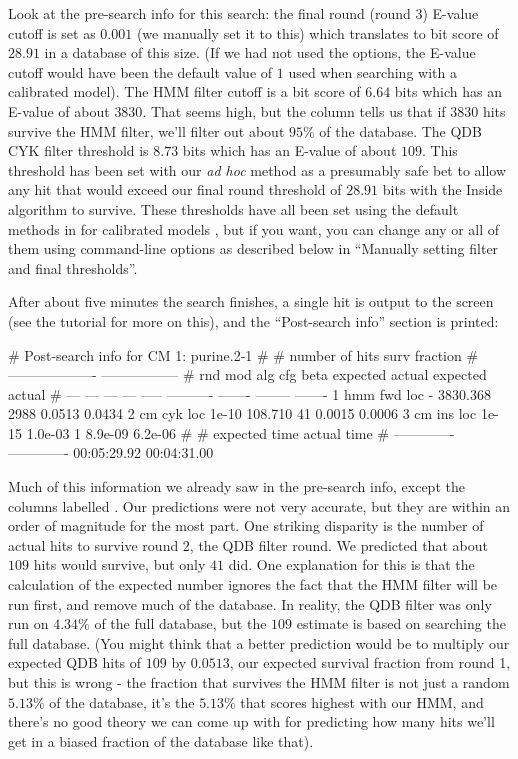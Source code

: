 Look at the pre-search info for this search: the final round (round 3)
E-value cutoff is set as $0.001$ (we manually set it to this) which
translates to bit score of $28.91$ in a database of this size. (If we
had not used the  options, the E-value cutoff would have been
the default value of $1$ used when searching with a calibrated
model). The HMM filter cutoff is a bit score of $6.64$ bits which has
an E-value of about $3830$.  That seems high, but the 
column tells us that if $3830$ hits survive the HMM filter, we'll
filter out about $95\%$ of the database. The QDB CYK filter threshold
is $8.73$ bits which has an E-value of about $109$. This threshold has
been set with our \emph{ad hoc} method as a presumably safe bet to
allow any hit that would exceed our final round threshold of $28.91$
bits with the Inside algorithm to survive. These thresholds have all
been set using the default methods in  for calibrated
models \cite{Nawrocki09b}, but if you want, you can change any or all
of them using command-line options as described below in ``Manually
setting filter and final thresholds''.

After about five minutes the search finishes, a single hit is output
to the screen (see the tutorial for more on this), and the
``Post-search info'' section is printed:

\begin{sreoutput}
# Post-search info for CM 1: purine.2-1
#
#                              number of hits       surv fraction  
#                            -------------------  -----------------
# rnd  mod  alg  cfg   beta    expected   actual  expected   actual
# ---  ---  ---  ---  -----  ----------  -------  --------  -------
    1  hmm  fwd  loc      -    3830.368     2988    0.0513   0.0434
    2   cm  cyk  loc  1e-10     108.710       41    0.0015   0.0006
    3   cm  ins  loc  1e-15     1.0e-03        1   8.9e-09  6.2e-06
#
# expected time    actual time
# -------------  -------------
    00:05:29.92    00:04:31.00
\end{sreoutput}

Much of this information we already saw in the pre-search info, except
the columns labelled . Our predictions were not very
accurate, but they are within an order of magnitude for the most
part. One striking disparity is the number of actual hits to survive
round 2, the QDB filter round. We predicted that about $109$ hits
would survive, but only $41$ did. One explanation for this is
that the calculation of the expected number ignores the fact that the
HMM filter will be run first, and remove much of the database. In
reality, the QDB filter was only run on $4.34\%$ of the full
database, but the $109$ estimate is based on searching the full
database. (You might think that a better prediction would be to 
multiply our expected QDB hits of $109$ by $0.0513$, our expected
survival fraction from round 1, but this is wrong - the fraction that
survives the HMM filter is not just a random $5.13\%$ of the database,
it's the $5.13\%$ that scores highest with our HMM, and there's no good
theory we can come up with for predicting how many hits we'll get in a
biased fraction of the database like that).

